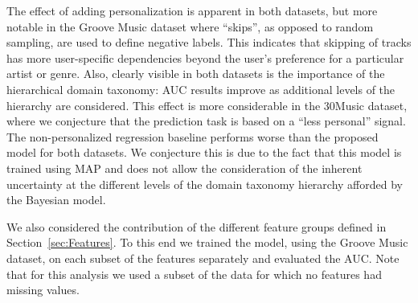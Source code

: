 The effect of adding personalization is apparent in both datasets, but more notable in the Groove Music dataset where ``skips'', as opposed to random sampling, are used to define negative labels. This indicates that skipping of tracks has more user-specific dependencies beyond the user's preference for a particular artist or genre.
Also, clearly visible in both datasets is the importance of the hierarchical domain taxonomy: AUC results improve as additional levels of the hierarchy are considered. This effect is more considerable in the 30Music dataset, where we conjecture that the prediction task is based on a ``less personal'' signal. The non-personalized regression baseline performs worse than the proposed model for both datasets. We conjecture this is due to the fact that this model is trained using MAP and does not allow the consideration of the inherent uncertainty at the different levels of the domain taxonomy hierarchy afforded by the Bayesian model.


%

%


%




We also considered the contribution of the different feature groups defined in Section~\ref{sec:Features}. To this end we trained the model, using the Groove Music dataset, on each subset of the features separately and evaluated the AUC. Note that for this analysis we used a subset of the data for which no features had missing values. 

